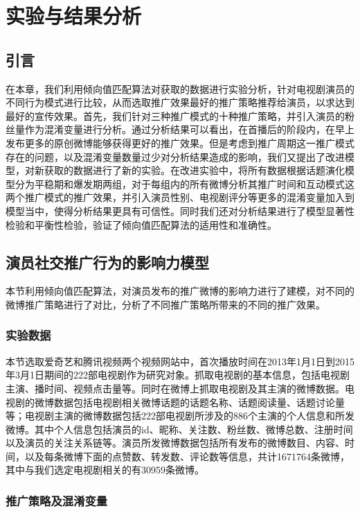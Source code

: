 \chapter{实验与结果分析}

\section{引言}

在本章，我们利用倾向值匹配算法对获取的数据进行实验分析，针对电视剧演员的不同行为模式进行比较，从而选取推广效果最好的推广策略推荐给演员，以求达到最好的宣传效果。首先，我们针对三种推广模式的十种推广策略，并引入演员的粉丝量作为混淆变量进行分析。通过分析结果可以看出，在首播后的阶段内，在早上发布更多的原创微博能够获得更好的推广效果。但是考虑到推广周期这一推广模式存在的问题，以及混淆变量数量过少对分析结果造成的影响，我们又提出了改进模型，对新获取的数据进行了新的实验。在改进实验中，将所有数据根据话题演化模型分为平稳期和爆发期两组，对于每组内的所有微博分析其推广时间和互动模式这两个推广模式的推广效果，并引入演员性别、电视剧评分等更多的混淆变量加入到模型当中，使得分析结果更具有可信性。同时我们还对分析结果进行了模型显著性检验和平衡性检验，验证了倾向值匹配算法的适用性和准确性。

\section{演员社交推广行为的影响力模型}

本节利用倾向值匹配算法，对演员发布的推广微博的影响力进行了建模，对不同的微博推广策略进行了对比，分析了不同推广策略所带来的不同的推广效果。

\subsection{实验数据}

本节选取爱奇艺和腾讯视频两个视频网站中，首次播放时间在2013年1月1日到2015年3月1日期间的222部电视剧作为研究对象。抓取电视剧的基本信息，包括电视剧主演、播时间、视频点击量等。同时在微博上抓取电视剧及其主演的微博数据。电视剧的微博数据包括电视剧相关微博话题的话题名称、话题阅读量、话题讨论量等；电视剧主演的微博数据包括222部电视剧所涉及的886个主演的个人信息和所发微博。其中个人信息包括演员的id、昵称、关注数、粉丝数、微博总数、注册时间以及演员的关注关系链等。演员所发微博数据包括所有发布的微博数目、内容、时间，以及每条微博下面的点赞数、转发数、评论数等信息，共计1671764条微博，其中与我们选定电视剧相关的有30959条微博。

\subsection{推广策略及混淆变量}

